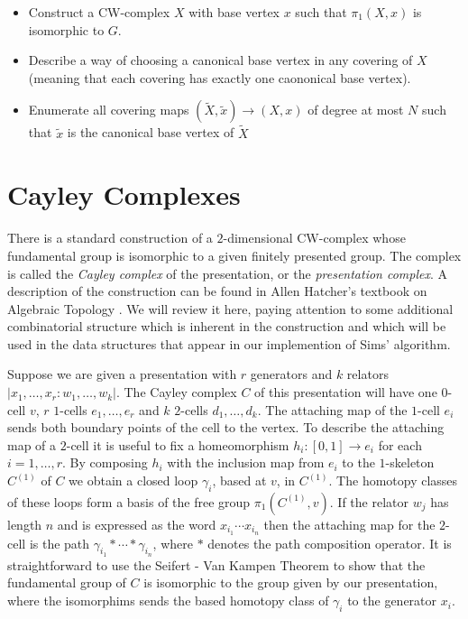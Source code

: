 \documentclass[12pt]{article}
\begin{document}
  \begin{itemize}
  \item Construct a CW-complex $X$ with base vertex $x$ such that
    $\pi_1(X, x)$ is isomorphic to $G$.
   \item Describe a way of choosing a canonical base vertex in any
     covering of $X$ (meaning that each covering has exactly one caononical base vertex).
   \item Enumerate all covering maps $(\tilde X, \tilde x)\to (X,
     x)$ of degree at most $N$ such that $\tilde x$ is the canonical base
     vertex of $\tilde X$
   \end{itemize}

   \section{Cayley Complexes}

   There is a standard construction of a $2$-dimensional CW-complex whose
   fundamental group is isomorphic to a given finitely presented group.  The
   complex is called the {\it Cayley complex} of the presentation, or the {\it
     presentation complex}.  A description of the construction can be found in
   Allen Hatcher's textbook on Algebraic Topology \cite[Section 1.3]{Hatcher}.
   We will review it here, paying attention to some additional combinatorial
   structure which is inherent in the construction and which will be used in the
   data structures that appear in our implemention of Sims' algorithm.

   Suppose we are given a presentation with $r$ generators and $k$ relators
   $|x_1, \ldots, x_r : w_1, \ldots, w_k|$.  The Cayley complex $C$ of this
   presentation will have one $0$-cell $v$, $r$ $1$-cells $e_1, \ldots, e_r$ and
   $k$ $2$-cells $d_1, \ldots, d_k$. The attaching map of the $1$-cell $e_i$
   sends both boundary points of the cell to the vertex.  To describe the
   attaching map of a $2$-cell it is useful to fix a homeomorphism
   $h_i : [0,1] \to e_i$ for each $i = 1, \ldots, r$.  By composing $h_i$ with
   the inclusion map from $e_i$ to the $1$-skeleton $C^{(1)}$ of $C$ we obtain a
   closed loop $\gamma_i$, based at $v$, in $C^{(1)}$.  The homotopy classes of
   these loops form a basis of the free group $\pi_1(C^{(1)}, v)$.  If the
   relator $w_j$ has length $n$ and is expressed as the word
   $x_{i_1}\cdots x_{i_n}$ then the attaching map for the $2$-cell is the path
   $\gamma_{i_1}\ast\cdots\ast\gamma_{i_n}$, where $\ast$ denotes the path
   composition operator.  It is straightforward \cite[Corollary 1.28]{Hatcher}
   to use the Seifert - Van Kampen Theorem to show that the fundamental group of
   $C$ is isomorphic to the group given by our presentation, where the
   isomorphims sends the based homotopy class of $\gamma_i$ to the generator $x_i$.
\end{document}
